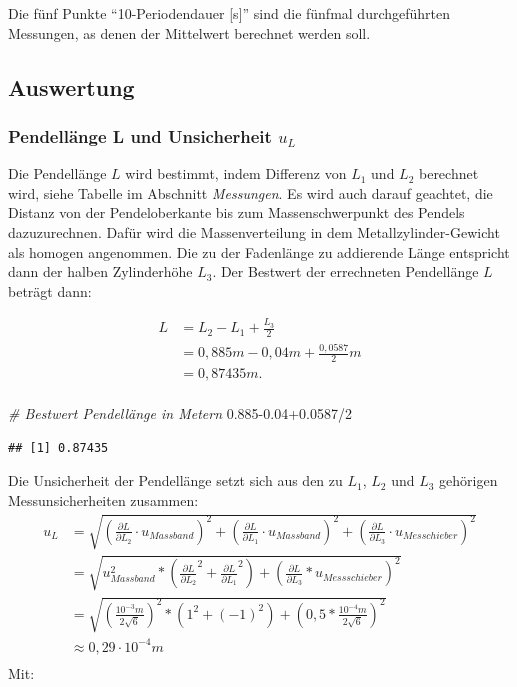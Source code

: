 \documentclass[
  9pt,
]{article}
\newenvironment{Shaded}{\begin{snugshade}}{\end{snugshade}}
\newcommand{\CommentTok}[1]{\textcolor[rgb]{0.56,0.35,0.01}{\textit{#1}}}
\newcommand{\DecValTok}[1]{\textcolor[rgb]{0.00,0.00,0.81}{#1}}
\newcommand{\FloatTok}[1]{\textcolor[rgb]{0.00,0.00,0.81}{#1}}
\newcommand{\SpecialCharTok}[1]{\textcolor[rgb]{0.00,0.00,0.00}{#1}}
\begin{document}
Die fünf Punkte ``10-Periodendauer {[}s{]}'' sind die fünfmal
durchgeführten Messungen, as denen der Mittelwert berechnet werden soll.

\hypertarget{auswertung}{%
\subsection{Auswertung}\label{auswertung}}

\hypertarget{pendelluxe4nge-l-und-unsicherheit-u_l}{%
\subsubsection{\texorpdfstring{Pendellänge L und Unsicherheit
\(u_L\)}{Pendellänge L und Unsicherheit u\_L}}\label{pendelluxe4nge-l-und-unsicherheit-u_l}}

Die Pendellänge \(L\) wird bestimmt, indem Differenz von \(L_1\) und
\(L_2\) berechnet wird, siehe Tabelle im Abschnitt \textit{Messungen}.
Es wird auch darauf geachtet, die Distanz von der Pendeloberkante bis
zum Massenschwerpunkt des Pendels dazuzurechnen. Dafür wird die
Massenverteilung in dem Metallzylinder-Gewicht als homogen angenommen.
Die zu der Fadenlänge zu addierende Länge entspricht dann der halben
Zylinderhöhe \(L_3\). Der Bestwert der errechneten Pendellänge \(L\)
beträgt dann:

\begin{align*}
L&= L_2-L_1+\frac{L_{3}}{2}\\
 &=0,885m-0,04m+\frac{0,0587}{2}m\\
 &=0,87435m.\\
\end{align*}

\begin{Shaded}
\begin{Highlighting}[]
\CommentTok{\# Bestwert Pendellänge in Metern}
\FloatTok{0.885{-}0.04+0.0587}\SpecialCharTok{/}\DecValTok{2}
\end{Highlighting}
\end{Shaded}

\begin{verbatim}
## [1] 0.87435
\end{verbatim}

Die Unsicherheit der Pendellänge setzt sich aus den zu \(L_1\), \(L_2\)
und \(L_3\) gehörigen Messunsicherheiten zusammen: \begin{align*}
u_L&= \sqrt{(\frac{\partial L}{\partial L_2} \cdot u_{Massband})^2+(\frac{\partial L}{\partial L_1} \cdot u_{Massband})^2+(\frac{\partial L}{\partial L_{3}} \cdot u_{Messchieber})^2}\\
&= \sqrt{u_{Massband}^2*(\frac{\partial L}{\partial L_2}^2+\frac{\partial L}{\partial L_1}^2)+(\frac{\partial L}{\partial L_{3}}*u_{Messschieber})^2}\\
&=\sqrt{(\frac{10^{-3}m}{2\sqrt{6}})^2*(1^2+(-1)^2)+(0,5*\frac{10^{-4}m}{2\sqrt{6}})^2}\\
&\approx 0,29 \cdot 10^{-4}m\\
\end{align*} Mit:
\end{document}
